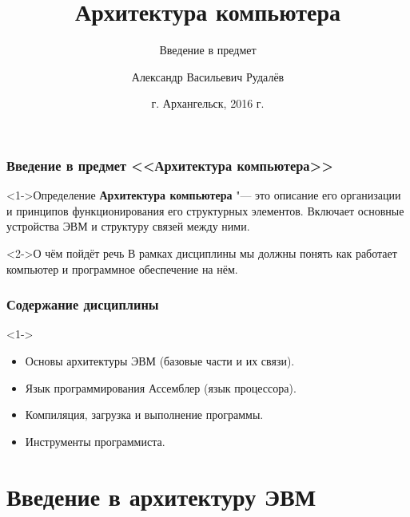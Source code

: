 \documentclass[pdf,9pt,aspectratio=169]{beamer}
\title[Архитектура компьютера: Введение в предмет]{Архитектура компьютера}
\subtitle{Введение в предмет}
\author[А.В. Рудалёв]{Александр Васильевич Рудалёв}
\institute[ИМИКТ САФУ]{ИМИКТ САФУ}
\date[г. Архангельск, 2016 г.]{г. Архангельск, 2016 г.}
\begin{document}
\frame{\titlepage}

\begin{frame}\frametitle{Введение в предмет <<Архитектура компьютера>>}
  \begin{block}<1->{Определение}
    \textbf{Архитектура компьютера} "---  это описание его организации и принципов функционирования его структурных элементов. Включает основные устройства ЭВМ и структуру связей между ними.
  \end{block}
  \begin{block}<2->{О чём пойдёт речь}
    В рамках дисциплины мы должны понять как работает компьютер и программное обеспечение на нём.
  \end{block}
\end{frame}

\begin{frame}\frametitle{Содержание дисциплины}
  \begin{block}<1->{}
    \begin{itemize}
      \item Основы архитектуры ЭВМ (базовые части и их связи).
      \item Язык программирования Ассемблер (язык процессора).
      \item Компиляция, загрузка и выполнение программы.
      \item Инструменты программиста.
    \end{itemize}
  \end{block}
\end{frame}

\section{Введение в архитектуру ЭВМ}
\end{document}
